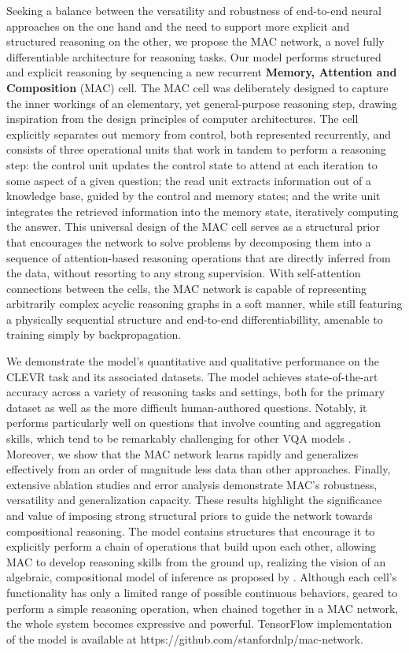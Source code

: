 \documentclass[fleqn]{article}
\begin{document}
Seeking a balance between the versatility and robustness of end-to-end neural approaches on the one hand and the need to support more explicit and structured reasoning on the other, we propose the MAC network, a novel fully differentiable architecture for reasoning tasks. Our model performs structured and explicit reasoning by sequencing a new recurrent \textbf{Memory, Attention and Composition} (MAC) cell. The MAC cell was deliberately designed to capture the inner workings of an elementary, yet general-purpose reasoning step, drawing inspiration from the design principles of computer architectures. The cell explicitly separates out memory from control, both represented recurrently, and consists of three operational units that work in tandem to perform a reasoning step: the control unit updates the control state to attend at each iteration to some aspect of a given question; the read unit extracts information out of a knowledge base, guided by the control and memory states; and the write unit integrates the retrieved information into the memory state, iteratively computing the answer. This universal design of the MAC cell serves as a structural prior that encourages the network to solve problems by decomposing them into a sequence of attention-based reasoning operations that are directly inferred from the data, without resorting to any strong supervision. With self-attention connections between the cells, the MAC network is capable of representing arbitrarily complex acyclic reasoning graphs in a soft manner, while still featuring a physically sequential structure and end-to-end differentiabillity, amenable to training simply by backpropagation.

We demonstrate the model's quantitative and qualitative performance on the CLEVR task and its associated datasets. The model achieves state-of-the-art accuracy across a variety of reasoning tasks and settings, both for the primary dataset as well as the more difficult human-authored questions. Notably, it performs particularly well on questions that involve counting and aggregation skills, which tend to be remarkably challenging for other VQA models \citep{rn, nmn3, pgee}. Moreover, we show that the MAC network learns rapidly and generalizes effectively from an order of magnitude less data than other approaches. Finally, extensive ablation studies and error analysis demonstrate MAC's robustness, versatility and generalization capacity. These results highlight the significance and value of imposing strong structural priors to guide the network towards compositional reasoning.
The model contains structures that encourage it to explicitly perform a chain of operations that build upon each other, allowing MAC to develop reasoning skills from the ground up, realizing the vision of an algebraic, compositional model of inference as proposed by \citet{bottou}. Although each cell's functionality has only a limited range of possible continuous behaviors, geared to perform a simple reasoning operation, when chained together in a MAC network, the whole system becomes expressive and powerful. TensorFlow implementation of the model is available at https://github.com/stanfordnlp/mac-network.
 
\end{document}

